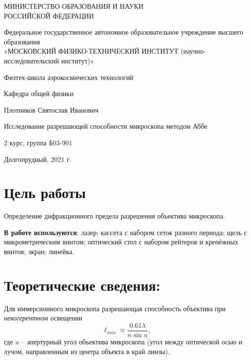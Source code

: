 \documentclass[a4paper,12pt]{article}
\begin{document}
\begin{titlepage}
	 \begin{center}
    \large
    МИНИСТЕРСТВО ОБРАЗОВАНИЯ И НАУКИ\\ РОССИЙСКОЙ ФЕДЕРАЦИИ
     
    \vspace{0.5cm}
 
    Федеральное государственное автономное образовательное учреждение высшего образования \\ «МОСКОВСКИЙ ФИЗИКО-ТЕХНИЧЕСКИЙ ИНСТИТУТ (научно-исследовательский институт)»
    \vspace{0.25cm}

  Физтех-школа аэрокосмических технологий
     
    Кафедра общей физики
    \vfill
     
     

    
    Плотников Святослав Иванович
    \vfill
 
     
    {\LARGE Исследование разрешающей способности микроскопа
методом Аббе\\}
     
   2 курс, группа Б03-901
\end{center}
\vfill

\vfill
 
\begin{center}
  Долгопрудный, 2021 г.
\end{center}
\end{titlepage}

\tableofcontents
{}
\newpage
\section{Цель работы}Определение дифракционного предела разрешения объектива микроскопа.








\textbf{В работе используются}: лазер; кассета с набором сеток разного периода; щель с микрометрическим винтом; оптический стол с набором рейтеров и крепёжных винтов; экран; линейка.
\section{Теоретические сведения:}
Для иммерсионного микроскопа разрешающая способность объектива при \textit{некогерентном} освещении
\begin{equation}
\ell_{min} \approx \dfrac{0.61\lambda}{n \sin u},
\end{equation}
где $u$ -- апертурный угол объектива микроскопа (угол между оптической осью и лучом, направленным из центра объекта в край линзы).
\end{document}
